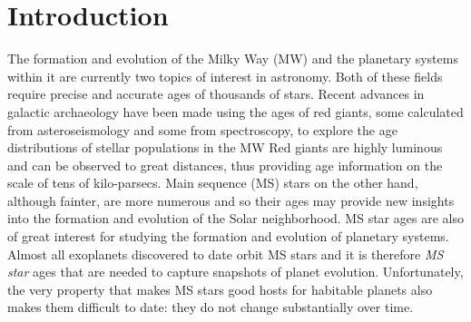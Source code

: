 \section{Introduction}
\label{section:intro}


The formation and evolution of the Milky Way (MW) and the planetary systems
within it are currently two topics of interest in astronomy.
Both of these fields require precise and accurate ages of thousands of stars.
Recent advances in galactic archaeology have been made using the ages of red
giants, some calculated from asteroseismology and some from spectroscopy, to
explore the age distributions of stellar populations in the MW
Red giants are highly luminous and can be observed to great distances, thus
providing age information on the scale of tens of kilo-parsecs.
Main sequence (MS) stars on the other hand, although fainter, are more
numerous and so their ages may provide new insights into the formation and
evolution of the Solar neighborhood.
MS star ages are also of great interest for studying the formation and
evolution of planetary systems.
Almost all exoplanets discovered to date orbit MS stars and it is therefore
{\it MS star} ages that are needed to capture snapshots of planet evolution.
Unfortunately, the very property that makes MS stars good hosts for habitable
planets also makes them difficult to date: they do not change substantially
over time.

